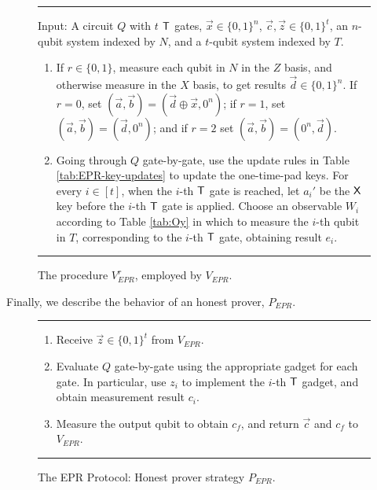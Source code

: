 \documentclass[11pt,letter]{article}
\theoremstyle{remark}
\theoremstyle{definition}
\begin{document}
\begin{figure}[H]
\rule[1ex]{16.5cm}{0.5pt}
\raggedright
Input: A circuit $Q$ with $t$ $\sf T$ gates, $\vec{x}\in\{0,1\}^n$, $\vec{c},\vec{z}\in\{0,1\}^t$, an $n$-qubit system indexed by $N$, and a $t$-qubit system indexed by $T$.
\begin{enumerate}
\item If $r\in\{0,1\}$, measure each qubit in $N$ in the $Z$ basis, and otherwise measure in the $X$ basis, to get results $\vec{d}\in\{0,1\}^n$. If $r=0$, set $(\vec{a},\vec{b})=(\vec{d}\oplus \vec{x},0^n)$; if $r=1$, set $(\vec{a},\vec{b})=(\vec{d},0^n)$; and if $r=2$ set $(\vec{a},\vec{b})=(0^n,\vec{d})$. 
\item Going through $Q$ gate-by-gate, use the update rules in Table
  \ref{tab:EPR-key-updates} to update the one-time-pad keys. For every
    $i\in[t]$, when the $i$-th $\sf T$ gate is reached, let $a_i'$ be the $\sf
    X$ key before the $i$-th $\sf T$ gate is applied. Choose an observable $W_i$ according to Table \ref{tab:Oy} in which to measure the $i$-th qubit in $T$, corresponding to the $i$-th $\sf T$ gate, obtaining result $e_i$.  
\end{enumerate}
\rule[2ex]{16.5cm}{0.5pt}\vspace{-.5cm}
\caption{The procedure $V_{EPR}^r$, employed by $V_{EPR}$.}
  \label{fig:original-protocol-VEPRr}
\end{figure}

\noindent Finally, we describe the behavior of an honest prover, $P_{EPR}$.

\begin{figure}[H]
\rule[1ex]{16.5cm}{0.5pt}
\begin{enumerate}
\item Receive $\vec{z}\in\{0,1\}^t$ from $V_{EPR}$. 
\item Evaluate $Q$ gate-by-gate using the appropriate gadget for each gate.
In particular, use $z_i$ to implement the $i$-th $\sf T$ gadget, and obtain measurement result $c_i$. 
\item Measure the output qubit to obtain $c_f$, and return $\vec{c}$ and $c_f$ to $V_{EPR}$.
\end{enumerate}
\rule[2ex]{16.5cm}{0.5pt}\vspace{-.5cm}
\caption{The EPR Protocol: Honest prover strategy $P_{EPR}$.}
  \label{fig:original-protocol-PEPR}
\end{figure}
\end{document}
